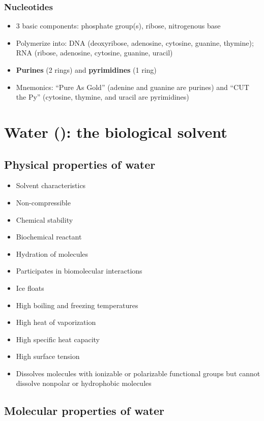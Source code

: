 \documentclass[a4paper, 12pt]{article}
\begin{document}
\subsubsection*{Nucleotides}

\begin{itemize}
\item 3 basic components: phosphate group(s), ribose, nitrogenous base
\item Polymerize into: DNA (deoxyribose, adenosine, cytosine, guanine, thymine); RNA (ribose, adenosine, cytosine, guanine, uracil)
\item \textbf{Purines} (2 rings) and \textbf{pyrimidines} (1 ring)
\item Mnemonics: ``Pure As Gold'' (adenine and guanine are purines) and ``CUT the Py'' (cytosine, thymine, and uracil are pyrimidines)
\end{itemize}

\newpage

\section*{Water (): the biological solvent}

\subsection*{Physical properties of water}

\begin{itemize}
\item Solvent characteristics
\item Non-compressible
\item Chemical stability
\item Biochemical reactant
\item Hydration of molecules
\item Participates in biomolecular interactions
\item Ice floats
\item High boiling and freezing temperatures
\item High heat of vaporization
\item High specific heat capacity
\item High surface tension
\item Dissolves molecules with ionizable or polarizable functional groups but cannot dissolve nonpolar or hydrophobic molecules
\end{itemize}

\subsection*{Molecular properties of water}
\end{document}
